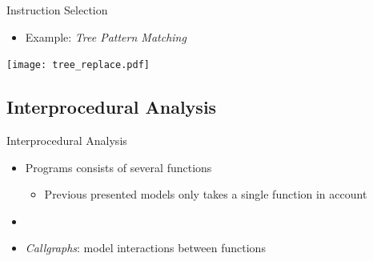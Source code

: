 
\begin{frame}{Instruction Selection}

\begin{itemize}
    \item Example: \textit{Tree Pattern Matching}
\end{itemize}
\begin{center}
	 \texttt{[image: tree\_replace.pdf]}
\end{center}

\end{frame}


\subsection{Interprocedural Analysis}


\begin{frame}{Interprocedural Analysis}

\begin{itemize}
    \item Programs consists of several functions
    \begin{itemize}
        \item Previous presented models only takes a single function in account
    \end{itemize}
    \item[]
    \item \textit{Callgraphs}: model interactions between functions
\end{itemize}

\end{frame}


